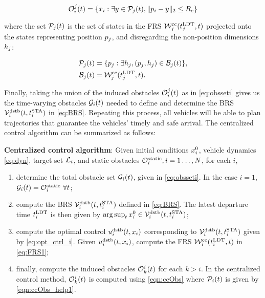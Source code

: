 \begin{equation} \label{eqn:ccObs}
\ioset_i^j(t) = \{\state_i: \exists y \in \pfrs_j(t), \|\pos_i - y\|_2 \le \rc \}
\end{equation}

\noindent where the set $\mathcal{P}_j(t)$ is the set of states in the FRS $\mathcal{W}_j^\text{cc}(t^\text{LDT}_j, t)$ projected onto the states representing position $p_j$, and disregarding the non-position dimensions $h_j$:

\begin{align} 
\pfrs_j(t) & = \{p_j: \exists \npos_j, (p_j, \npos_j) \in \boset_j(t) \}, \label{eqn:ccObs_help1}\\
\boset_j(t) & = \frs_j^\text{cc}(\ldt_j, t). \label{eqn:ccObs_help2}
\end{align}

Finally, taking the union of the induced obstacles $\mathcal{O}_i^j(t)$ as in \eqref{eq:obsseti} gives us the time-varying obstacles $\mathcal{G}_i(t)$ needed to define and determine the BRS $\mathcal{V}_i^\text{dstb}(t, t^\text{STA}_i)$ in \eqref{eq:BRS}. Repeating this process, all vehicles will be able to plan trajectories that guarantee the vehicles' timely and safe arrival. The centralized control algorithm can be summarized as follows:
\begin{alg}
\label{alg:cc}
\textbf{Centralized control algorithm}: Given initial conditions $x_i^0$, vehicle dynamics \eqref{eq:dyn}, target set $\mathcal{L}_i$, and static obstacles $\mathcal{O}^\text{static}_i, i = 1\ldots, N$, for each $i$,
\begin{enumerate}[leftmargin = 0.5cm]
\item determine the total obstacle set $\mathcal{G}_i(t)$, given in \eqref{eq:obsseti}. In the case $i=1$, $\mathcal{G}_i(t) = \mathcal{O}^\text{static}_i ~ \forall t$;
\item compute the BRS $\mathcal{V}_i^\text{dstb}(t, t^\text{STA}_i)$ defined in \eqref{eq:BRS}. The latest departure time $t^\text{LDT}_i$ is then given by $\arg \sup_t x^0_i \in \mathcal{V}_i^\text{dstb}(t, t^\text{STA}_i)$;
\item compute the optimal control $u_i^\text{dstb}(t,x_i)$ corresponding to $\mathcal{V}_i^\text{dstb}(t, t^\text{STA}_i)$ given by \eqref{eq:opt_ctrl_i}. Given $u_i^\text{dstb}(t,x_i)$, compute the FRS $\mathcal{W}_i^\text{cc}(t^\text{LDT}_i, t)$ in \eqref{eq:FRS1};
\item finally, compute the induced obstacles $\mathcal{O}_k^i(t)$ for each $k>i$. In the centralized control method, $\mathcal{O}_k^i(t)$ is computed using \eqref{eqn:ccObs} where $\mathcal{P}_i(t)$ is given by \eqref{eqn:ccObs_help1}.
\end{enumerate}
\end{alg}